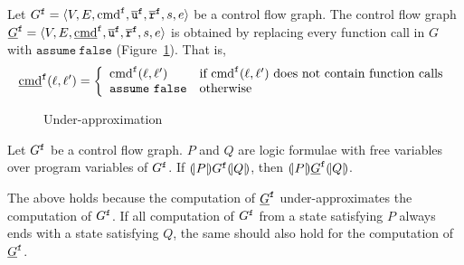 
Let $G^{\mathtt{{f}}} = \langle V, E, \textmd{cmd}^{\mathtt{{f}}}, \overline{\texttt{u}}^{\mathtt{{f}}}, \overline{\texttt{r}}^{\mathtt{{f}}},s,e \rangle$ be a control flow
graph. The control flow graph $\underline{G}^{\mathtt{{f}}} = \langle V, E,
\underline{\textmd{cmd}}^{\mathtt{{f}}}, \overline{\texttt{u}}^{\mathtt{{f}}}, \overline{\texttt{r}}^{\mathtt{{f}}},s,e \rangle$ is obtained by replacing every
function call in $G$ with $\mathtt{assume\ false}$
(Figure~\ref{figure:under-approximation}). That is,
\begin{equation*}
  \underline{\textmd{cmd}}^{\mathtt{{f}}} (\ell, \ell') =
  \left\{
    \begin{array}{ll}
      \textmd{cmd}^{\mathtt{{f}}} (\ell, \ell') & 
      \textmd{if } \textmd{cmd}^{\mathtt{{f}}} (\ell, \ell') 
      \textmd{ does not contain function calls}\\
      \mathtt{assume\ false} &
      \textmd{otherwise}
    \end{array}
  \right.
\end{equation*}

\begin{figure}[t]
  \centering

  \caption{Under-approximation}
  \label{figure:under-approximation}
\end{figure}

\begin{proposition}
  Let $G^{\mathtt{{f}}}$ be a control flow graph. $P$ and $Q$ are logic formulae with
  free variables over program variables of $G^{\mathtt{{f}}}$. If $(\!| {P} |\!)
  G^{\mathtt{{f}}} (\!| {Q} |\!)$, then 
  $(\!| {P} |\!) \underline{G}^{\mathtt{{f}}} (\!| {Q} |\!)$.
\end{proposition}
The above holds because the computation of $\underline{G}^{\mathtt{{f}}}$ under-approximates the computation of $G^{\mathtt{{f}}}$. If all computation of $G^{\mathtt{{f}}}$ from a state satisfying $P$ always ends with a state satisfying $Q$, the same should also hold for the computation of $\underline{G}^{\mathtt{{f}}}$.
